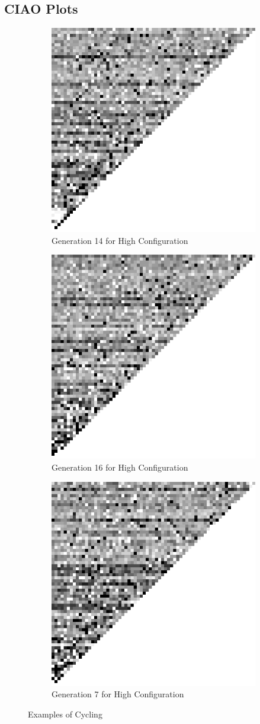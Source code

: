\subsection{CIAO Plots}

\begin{figure}[H]
    \begin{subfigure}{.4\textwidth}
        \centering
        \includegraphics[width=.4\linewidth]{images/cycling/high_config_14.png}
        \caption{Generation 14 for High Configuration}
        \label{fig:sfig1}
    \end{subfigure}
    \begin{subfigure}{.4\textwidth}
        \centering
        \includegraphics[width=0.4\linewidth]{images/cycling/high_config_16.png}
        \caption{Generation 16 for High Configuration}
        \label{fig:sfig2}
    \end{subfigure}
    \begin{subfigure}{.4\textwidth}
        \centering
        \includegraphics[width=0.4\linewidth]{images/cycling/high_config_7.png}
        \caption{Generation 7 for High Configuration}
        \label{fig:sfig4}
    \end{subfigure}
    \caption{Examples of Cycling}
    \label{ap_cyc}
\end{figure}

